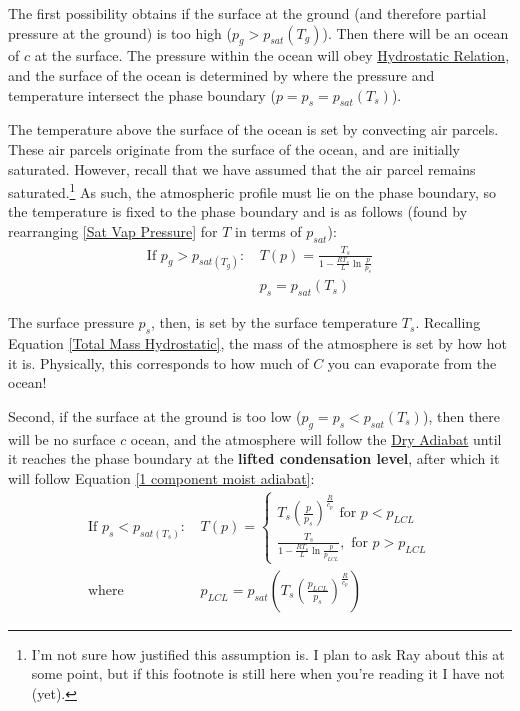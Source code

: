 The first possibility obtains if the surface at the ground (and therefore partial pressure at the ground) is too high ($p_g>p_{sat}(T_g)$). Then there will be an ocean of $c$ at the surface. The pressure within the ocean will obey \hyperref[Hydrostatic Balance]{Hydrostatic Relation}, and the surface of the ocean is determined by where the pressure and temperature intersect the phase boundary ($p=p_s=p_{sat}(T_s)$).

The temperature above the surface of the ocean is set by convecting air parcels. These air parcels originate from the surface of the ocean, and are initially saturated. However, recall that we have assumed that the air parcel remains saturated.\footnote{
    I'm not sure how justified this assumption is. I plan to ask Ray about this at some point, but if this footnote is still here when you're reading it I have not (yet).
} As such, the atmospheric profile must lie on the phase boundary, so the temperature is fixed to the phase boundary and is as follows (found by rearranging \ref{Sat Vap Pressure} for $T$ in terms of $p_{sat}$):
\begin{align}
    \text{If } p_g>p_{sat(T_g)}\text{: }& T(p)=\frac{T_s}{1-\frac{RT_s}{L}\ln\frac{p}{p_{s}}} \label{1 component moist adiabat} \\
    &p_s = p_{sat}(T_s)
\end{align}

The surface pressure $p_s$, then, is set by the surface temperature $T_s$. Recalling Equation \ref{Total Mass Hydrostatic}, the mass of the atmosphere is set by how hot it is. Physically, this corresponds to how much of $C$ you can evaporate from the ocean!

Second, if the surface at the ground is too low ($p_g=p_s<p_{sat}(T_s)$), then there will be no surface $c$ ocean, and the  atmosphere will follow the \hyperref[Dry Adiabat]{Dry Adiabat} until it reaches the phase boundary at the \textbf{lifted condensation level}, after which it will follow Equation \ref{1 component moist adiabat}:
\begin{align}
    \text{If } p_s<p_{sat(T_s)}\text{: }
    &
    T(p)=
    \begin{cases}
        T_s\left(\frac{p}{p_s}\right)^\frac{R}{c_p} \text{ for }p<p_{LCL}\\
        \frac{T_s}{1-\frac{RT_s}{L}\ln\frac{p}{p_{LCL}}}, \text{ for }p>p_{LCL}
    \end{cases}\\
    \text{where }&p_{LCL}=p_{sat}\left( T_s\left(\frac{p_{LCL}}{p_s}\right)^\frac{R}{c_p} \right)
\end{align}

